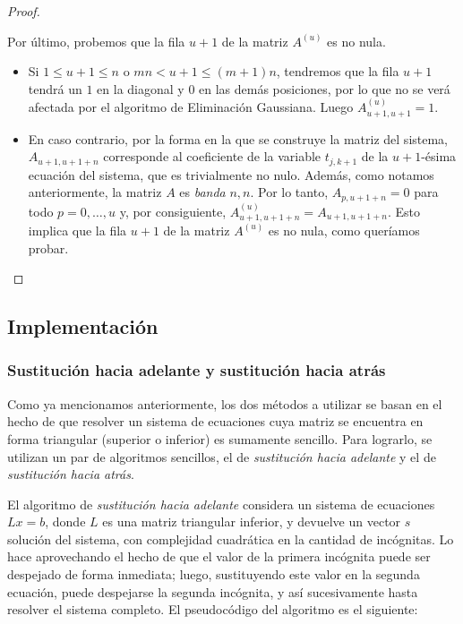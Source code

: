 \begin{proof}
\begin{itemize}
            Por último, probemos que la fila $u + 1$ de la matriz $A^{(u)}$ es no nula.
            \begin{itemize}
              \item Si $1 \leq u + 1 \leq n$ o $mn < u + 1 \leq (m+1)n$, tendremos que la fila $u + 1$ tendrá un $1$ en la diagonal y $0$ en las demás posiciones, por lo que no se verá afectada por el algoritmo de Eliminación Gaussiana. Luego $A^{(u)}_{u+1,u+1} = 1$.
              \item En caso contrario, por la forma en la que se construye la matriz del sistema, $A_{u+1,u+1+n}$ corresponde al coeficiente de la variable $t_{j,k+1}$ de la $u + 1$-ésima ecuación del sistema, que es trivialmente no nulo. Además, como notamos anteriormente, la matriz $A$ es \emph{banda} $n, n$. Por lo tanto, $A_{p,u+1+n} = 0$ para todo $p = 0, \dots, u$ y, por consiguiente, $A^{(u)}_{u+1,u+1+n} = A_{u+1,u+1+n}$. Esto implica que la fila $u + 1$ de la matriz $A^{(u)}$ es no nula, como queríamos probar. \qedhere
            \end{itemize}
          \end{itemize}
        \end{proof}

    \subsection{Implementación}

      \subsubsection*{Sustitución hacia adelante y sustitución hacia atrás}
        Como ya mencionamos anteriormente, los dos métodos a utilizar se basan en el hecho de que resolver un sistema de ecuaciones cuya matriz se encuentra en forma triangular (superior o inferior) es sumamente sencillo. Para lograrlo, se utilizan un par de algoritmos sencillos, el de \emph{sustitución hacia adelante} y el de \emph{sustitución hacia atrás}.

        El algoritmo de \emph{sustitución hacia adelante} considera un sistema de ecuaciones $Lx=b$, donde $L$ es una matriz triangular inferior, y devuelve un vector $s$ solución del sistema, con complejidad cuadrática en la cantidad de incógnitas. Lo hace aprovechando el hecho de que el valor de la primera incógnita puede ser despejado de forma inmediata; luego, sustituyendo este valor en la segunda ecuación, puede despejarse la segunda incógnita, y así sucesivamente hasta resolver el sistema completo. El pseudocódigo del algoritmo es el siguiente:

